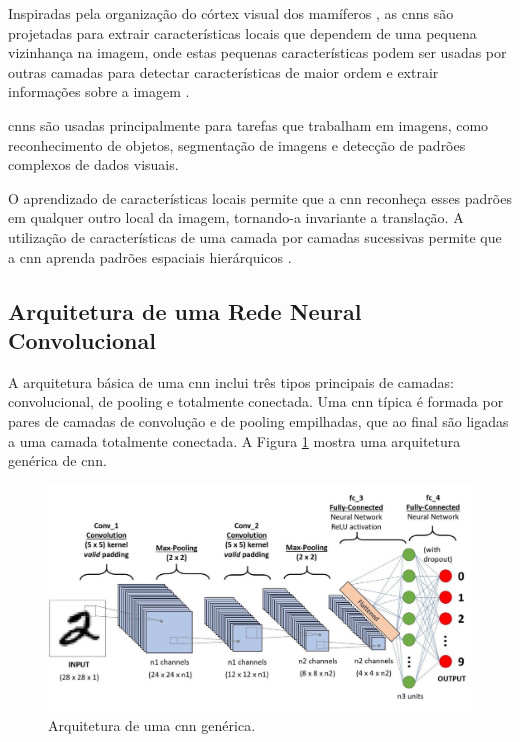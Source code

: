 Inspiradas pela organização do córtex visual dos mamíferos \cite{hubel1962}, as \acrshort{cnn}s são projetadas para 
extrair características locais que dependem de uma pequena vizinhança na imagem, onde estas pequenas características podem ser usadas por outras camadas para detectar características de maior ordem e extrair informações sobre a imagem \cite{book:Bishop}. 

\acrshort{cnn}s são usadas principalmente para tarefas que trabalham em imagens, como reconhecimento de objetos, segmentação de imagens e detecção de padrões complexos de dados visuais.

O aprendizado de características locais permite que a \acrshort{cnn} reconheça esses padrões em qualquer outro local da imagem,  tornando-a invariante a translação. A utilização de características de uma camada por camadas sucessivas permite que a \acrshort{cnn} aprenda padrões espaciais hierárquicos \cite{book:Chollet}.

\subsection{Arquitetura de uma Rede Neural Convolucional}

A arquitetura básica de uma \acrshort{cnn} inclui três tipos principais de camadas: convolucional, de pooling e totalmente conectada. 
Uma \acrshort{cnn} típica é formada por pares de camadas de convolução e de pooling empilhadas, que ao final são ligadas a uma camada totalmente conectada.
A Figura \ref{fig:cnn_arch} mostra uma arquitetura genérica de \acrshort{cnn}. 

\begin{figure}[htb]
\centerline{\includegraphics[width=1\linewidth]{images/cnn_placeholder.jpg}}
\caption{Arquitetura de uma \acrshort{cnn} genérica.}
\label{fig:cnn_arch}
\end{figure}

